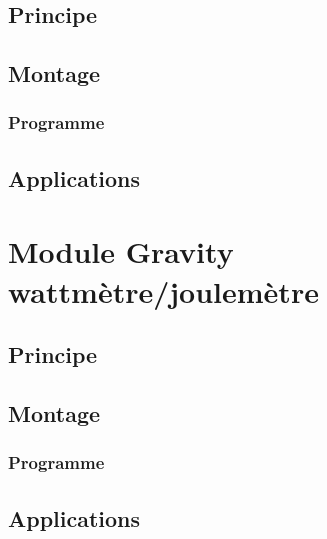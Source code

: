 \documentclass[a4paper,10pt,french]{book}
\begin{document}
\subsection{Principe}
\label{\detokenize{5_aller_plus_loin/1_teslametre:principe}}

\subsection{Montage}
\label{\detokenize{5_aller_plus_loin/1_teslametre:montage}}

\subsubsection{Programme}
\label{\detokenize{5_aller_plus_loin/1_teslametre:programme}}

\subsection{Applications}
\label{\detokenize{5_aller_plus_loin/1_teslametre:applications}}

\section{Module Gravity wattmètre/joulemètre}
\label{\detokenize{5_aller_plus_loin/2_wattmetre:module-gravity-wattmetre-joulemetre}}\label{\detokenize{5_aller_plus_loin/2_wattmetre::doc}}

\subsection{Principe}
\label{\detokenize{5_aller_plus_loin/2_wattmetre:principe}}

\subsection{Montage}
\label{\detokenize{5_aller_plus_loin/2_wattmetre:montage}}

\subsubsection{Programme}
\label{\detokenize{5_aller_plus_loin/2_wattmetre:programme}}

\subsection{Applications}
\label{\detokenize{5_aller_plus_loin/2_wattmetre:applications}}
\end{document}
